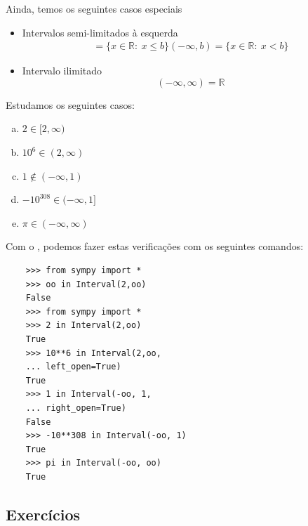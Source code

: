 Ainda, temos os seguintes casos especiais
\begin{itemize}
\item Intervalos semi-limitados à esquerda
  \begin{gather}
    [a, \infty) = \{x\in\mathbb{R}:~a\leq x\}
    (a, \infty) = \{x\in\mathbb{R}:~a< x\}
  \end{gather}
\item Intervalos semi-limitados à direita
  \begin{gather}
    (-\infty, b] = \{x\in\mathbb{R}:~x\leq b\}
    (-\infty, b) = \{x\in\mathbb{R}:~x< b\}
  \end{gather}
\item Intervalo ilimitado
  \begin{equation}
    (-\infty, \infty) = \mathbb{R}
  \end{equation}
\end{itemize}

\begin{ex}
  Estudamos os seguintes casos:
  \begin{enumerate}[a)]
  \item $2\in [2, \infty)$
  \item $10^6\in (2, \infty)$
  \item $1 \not\in (-\infty, 1)$
  \item $-10^{308} \in (-\infty, 1]$
  \item $\pi \in (-\infty, \infty)$
  \end{enumerate}
  \ifispython
  Com o \python, podemos fazer estas verificações com os seguintes comandos:
  \begin{lstlisting}
    >>> from sympy import *
    >>> oo in Interval(2,oo)
    False
    >>> from sympy import *
    >>> 2 in Interval(2,oo)
    True
    >>> 10**6 in Interval(2,oo,
    ... left_open=True)
    True
    >>> 1 in Interval(-oo, 1,
    ... right_open=True)
    False
    >>> -10**308 in Interval(-oo, 1)
    True
    >>> pi in Interval(-oo, oo)
    True
  \end{lstlisting}
  \fi
\end{ex}

\emconstrucao

\subsection*{Exercícios}

\emconstrucao

